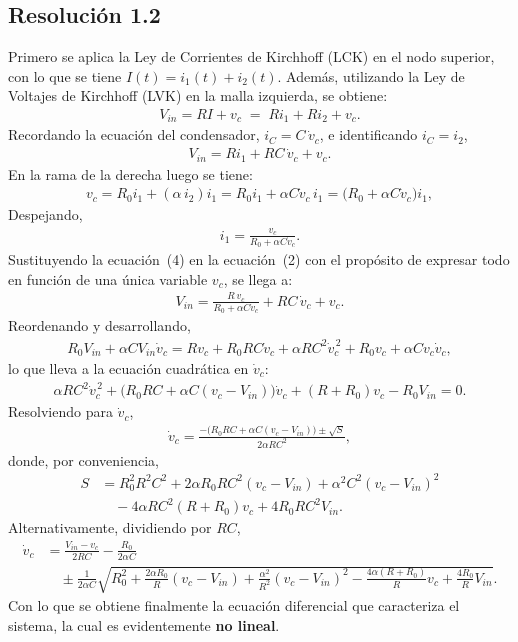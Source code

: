 \documentclass[
  11pt,
  letterpaper,
   addpoints,
   answers
  ]{exam}
\begin{document}
\begin{questions}
\begin{solution}
\subsection*{Resolución 1.2}
Primero se aplica la Ley de Corrientes de Kirchhoff (LCK) en el nodo superior, con lo que se tiene \(I(t)=i_1(t)+i_2(t)\). Además, utilizando la Ley de Voltajes de Kirchhoff (LVK) en la malla izquierda, se obtiene:
\begin{align}
V_{in}=RI+v_c \;=\; R i_1 + R i_2 + v_c .
\end{align}
Recordando la ecuación del condensador, \(i_C=C\,\dot v_c\), e identificando \(i_C=i_2\),
\begin{align}
V_{in}=R i_1 + RC\,\dot v_c + v_c .
\end{align}
En la rama de la derecha luego se tiene:
\begin{align}
v_c = R_0 i_1 + (\alpha\, i_2) i_1
    = R_0 i_1 + \alpha C \dot v_c\, i_1
    = \bigl(R_0 + \alpha C \dot v_c \bigr) i_1,
\end{align}
Despejando,
\begin{align}
i_1=\frac{v_c}{R_0+\alpha C \dot v_c}.
\end{align}
Sustituyendo la ecuación~(4) en la ecuación~(2) con el propósito de expresar todo en función de una única variable \(v_{c}\), se llega a:
\begin{align}
V_{in}= \frac{R\,v_c}{R_0+\alpha C \dot v_c} + RC\,\dot v_c + v_c .
\end{align}
Reordenando y desarrollando,
\begin{align}
R_0 V_{in}+ \alpha C V_{in}\dot v_c
= Rv_c + R_0 RC \dot v_c + \alpha RC^2 \dot v_c^{\,2} + R_0 v_c + \alpha C v_c \dot v_c ,
\end{align}
lo que lleva a la ecuación cuadrática en \(\dot v_c\):
\begin{align}
\alpha RC^2 \dot v_c^{\,2} + \bigl(R_0RC + \alpha C (v_c - V_{in})\bigr)\dot v_c
+ (R+R_0) v_c - R_0 V_{in} = 0.
\end{align}
Resolviendo para \(\dot v_c\),
\begin{align}
\dot v_c
= \frac{-\bigl(R_0RC + \alpha C (v_c - V_{in})\bigr) \pm \sqrt{S}}
       {2\alpha RC^2},
\end{align}
donde, por conveniencia,
\begin{align}
S
&= R_0^2 R^2 C^2
+ 2\alpha R_0 R C^2 (v_c - V_{in})
+ \alpha^2 C^2 (v_c - V_{in})^2 \nonumber\\
&\quad - 4\alpha R C^2 (R+R_0) v_c
+ 4 R_0 R C^2 V_{in}.
\end{align}
Alternativamente, dividiendo por \(RC\),
\begin{align}
\dot v_c
&= \frac{V_{in}-v_c}{2RC} - \frac{R_0}{2\alpha C} \nonumber\\
&\quad \pm \frac{1}{2\alpha C}\sqrt{
  R_0^2 + \frac{2\alpha R_0}{R}(v_c - V_{in})
  + \frac{\alpha^2}{R^2}(v_c - V_{in})^2
  - \frac{4\alpha (R+R_0)}{R} v_c + \frac{4R_0}{R}V_{in} } .
\end{align}
Con lo que se obtiene finalmente la ecuación diferencial que caracteriza el sistema, la cual es evidentemente \textbf{no lineal}.

\end{solution}
\end{questions}
\end{document}

